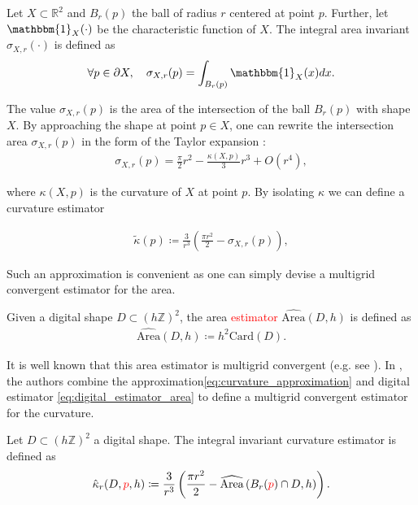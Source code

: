 \documentclass[smallextended]{svjour3}       %
\newcommand{\revision}[1]{\textcolor{red}{#1}}
\begin{document}
\begin{definition}
  Let $X \subset \mathbb{R}^2$ and $B_r(p)$ the ball of radius $r$ centered at point $p$. Further, let
  $\mathbbm{1}_X(\cdot)$ be the characteristic function of $X$. The integral area invariant $\sigma_{X,r}(\cdot)$ is
  defined as
  \begin{align*}
    \forall p \in \partial X, \quad \sigma_{X,r}(p) = \int_{B_r(p)}{ \mathbbm{1}_X(x) dx}.
  \end{align*}
\end{definition}


The value $\sigma_{X,r}(p)$ is the area of the intersection of the
ball $B_r(p)$ with shape $X$. By approaching the shape at
point $p \in X$, one can rewrite the intersection area
$\sigma_{X,r}(p)$ in the form of the Taylor expansion
\cite{pottman09intinvariant}:
\begin{align*}
  \sigma_{X,r}(p) = \frac{\pi}{2}r^2 - \frac{\kappa(X,p)}{3}r^3 + O(r^4),
\end{align*}
		
where $\kappa(X,p)$ is the curvature of $X$ at point $p$. By isolating $\kappa$ we can define a curvature estimator
	
\begin{align}
  \tilde{\kappa}(p) \coloneqq \frac{3}{r^3}\left( \frac{\pi r^2}{2} - \sigma_{X,r}(p) \right),
  \label{eq:curvature_approximation}
\end{align}
	
Such an approximation is convenient as one can simply devise a multigrid convergent estimator for the area.

\begin{definition}	
  Given a digital shape $D \subset (h \mathbb{Z})^2$,  the area \revision{estimator} $\widehat{\text{Area}}(D,h)$ is defined as	
  \begin{align}
    \widehat{\text{Area}}(D,h) \coloneqq h^2\text{Card}\left( D \right).	
    \label{eq:digital_estimator_area}
  \end{align}
\end{definition}
It is well known that this area estimator is multigrid convergent
(e.g. see \cite{klette2000multigrid}).  In
\cite{coeurjolly13integral}, the authors combine the
approximation\eqref{eq:curvature_approximation} and digital estimator
\eqref{eq:digital_estimator_area} to define a multigrid convergent
estimator for the curvature.

\begin{definition}
  Let $D \subset (h \mathbb{Z})^2$ a digital shape. The integral invariant curvature estimator is defined as
  \begin{align*}
    \hat{\kappa}_{r}(D,\revision{p},h) \coloneqq \frac{3}{r^3} \left( \frac{\pi r^2}{2} - \widehat{\text{Area}} \left( B_{r} ( \revision{p} ) \cap D, h \right) \right).
  \end{align*}
\end{definition}
\end{document}
